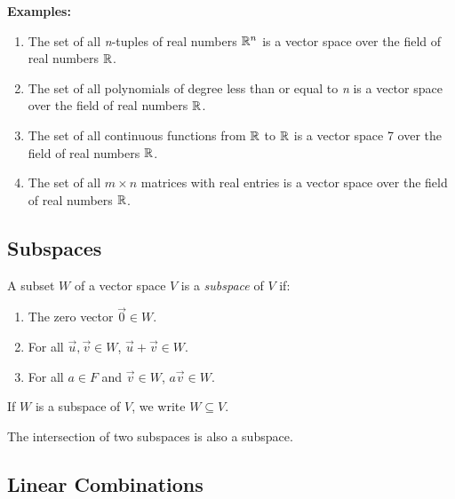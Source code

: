 \textbf{Examples:}

\begin{enumerate}

	\item The set of all \emph{n}-tuples of real numbers \(\mathbb{R}^n\) is a vector space over the field 
	      of real numbers \(\mathbb{R}\).

	\item The set of all polynomials of degree less than or equal to \emph{n} is a vector space over the 
	      field of real numbers \(\mathbb{R}\).

	\item The set of all continuous functions from \(\mathbb{R}\) to \(\mathbb{R}\) is a vector space 7
	      over the field of real numbers \(\mathbb{R}\).

	\item The set of all \(m \times n\) matrices with real entries is a vector space over the field of 
	      real numbers \(\mathbb{R}\).

\end{enumerate}

\subsection{Subspaces}

A subset \(W\) of a vector space \(V\) is a \emph{subspace} of \(V\) if:

\begin{enumerate}[label=\Roman*.]

	\item The zero vector \(\vec{0} \in W\).

	\item For all \(\vec{u}, \vec{v} \in W\), \(\vec{u} + \vec{v} \in W\).

	\item For all \(a \in F\) and \(\vec{v} \in W\), \(a\vec{v} \in W\).

\end{enumerate}

If \(W\) is a subspace of \(V\), we write \(W \subseteq V\).
\vspace{\baselineskip}

The intersection of two subspaces is also a subspace.

\subsection{Linear Combinations}

